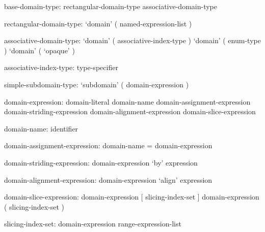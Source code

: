 \begin{syntax}
base-domain-type:
  rectangular-domain-type
  associative-domain-type
\end{syntax}

\begin{syntax}
rectangular-domain-type:
  `domain' ( named-expression-list )
\end{syntax}

\begin{syntax}
associative-domain-type:
  `domain' ( associative-index-type )
  `domain' ( enum-type )
  `domain' ( `opaque' )
\end{syntax}

\begin{syntax}
associative-index-type:
  type-specifier
\end{syntax}

\begin{syntax}
simple-subdomain-type:
  `subdomain' ( domain-expression )
\end{syntax}

\begin{syntax}
domain-expression:
  domain-literal
  domain-name
  domain-assignment-expression
  domain-striding-expression
  domain-alignment-expression
  domain-slice-expression
\end{syntax}

\begin{syntax}
domain-name:
  identifier
\end{syntax}

\begin{syntax}
domain-assignment-expression:
  domain-name = domain-expression
\end{syntax}

\begin{syntax}
domain-striding-expression:
  domain-expression `by' expression
\end{syntax}

\begin{syntax}
domain-alignment-expression:
  domain-expression `align' expression
\end{syntax}

\begin{syntax}
domain-slice-expression:
  domain-expression [ slicing-index-set ]
  domain-expression ( slicing-index-set )
\end{syntax}

\begin{syntax}
slicing-index-set:
  domain-expression
  range-expression-list
\end{syntax}

